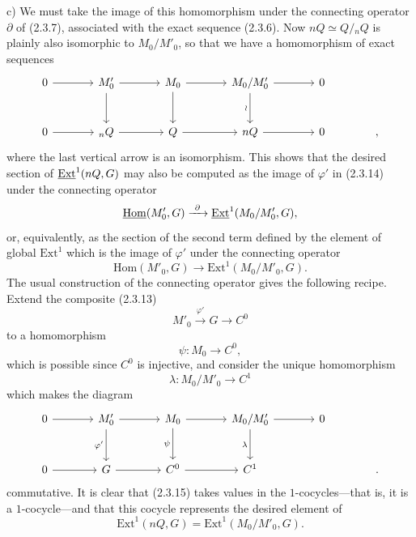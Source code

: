 
\medskip
\noindent c) We must take the image of this homomorphism under the
connecting operator $\partial$ of (2.3.7), associated with the exact
sequence (2.3.6).  Now $nQ\simeq Q/{}_nQ$ is plainly also isomorphic
to $M_0/M'_0$, so that we have a homomorphism of exact sequences
\[
\begin{tikzcd}[column sep=large,row sep=large]
 0\arrow[r]&M'_0\arrow[r]\arrow[d]&M_0\arrow[r]\arrow[d]
   &M_0/M'_0\arrow[r]\arrow[d,"\wr"']&0\\
 0\arrow[r]&{}_nQ\arrow[r]&Q\arrow[r]&nQ\arrow[r]&0&{,}
\end{tikzcd}
\]
where the last vertical arrow is an isomorphism.  This shows that the
desired section of $\uExt^1(nQ,G)$ may also be computed as the image
of $\varphi'$ in (2.3.14) under the connecting operator
\[
 \uHom(M'_0,G)\xrightarrow{\ \partial\ }
 \uExt^1(M_0/M'_0,G),
\]
or, equivalently, as the section of the second term defined by the
element of global $\mathrm{Ext}^1$ which is the image of $\varphi'$
under the connecting operator
\[
 \mathrm{Hom}(M'_0,G)\longrightarrow
 \mathrm{Ext}^1(M_0/M'_0,G).
\]
The usual construction of the connecting operator gives the following
recipe.  Extend the composite (2.3.13)
\[
 M'_0\xrightarrow{\ \varphi'\ }G\longrightarrow C^0
\]
to a homomorphism
\[
 \psi:M_0\longrightarrow C^0,
\]
which is possible since $C^0$ is injective, and consider the unique
homomorphism
\begin{equation}\tag{2.3.15}
 \lambda:M_0/M'_0\longrightarrow C^1
\end{equation}
which makes the diagram
\[
\begin{tikzcd}[column sep=large,row sep=large]
 0\arrow[r]&M'_0\arrow[r]\arrow[d,"\varphi'"']
   &M_0\arrow[r]\arrow[d,"\psi"']
   &M_0/M'_0\arrow[r]\arrow[d,"\lambda"']&0\\
 0\arrow[r]&G\arrow[r]&C^0\arrow[r]&C^1&&{.}
\end{tikzcd}
\]
commutative.  It is clear that (2.3.15) takes values in the
$1$-cocycles---that is, it is a $1$-cocycle---and that this cocycle
represents the desired element of
\[
 \mathrm{Ext}^1(nQ,G)=\mathrm{Ext}^1(M_0/M'_0,G).
\]

